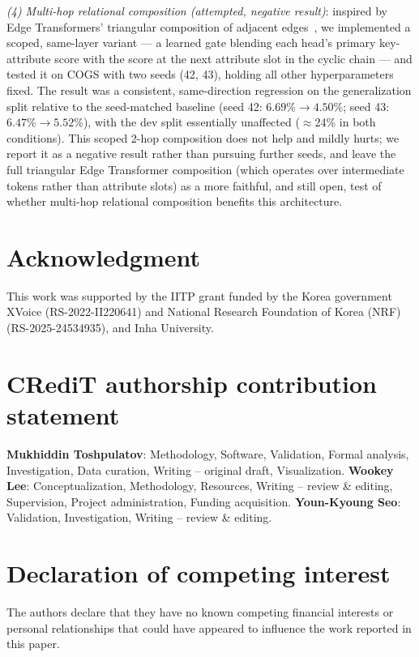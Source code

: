 \documentclass[review]{elsarticle}
\begin{document}
\emph{(4) Multi-hop relational composition (attempted, negative result)}: inspired by Edge Transformers' triangular composition of adjacent edges~\cite{bergen2021edge}, we implemented a scoped, same-layer variant --- a learned gate blending each head's primary key-attribute score with the score at the next attribute slot in the cyclic chain --- and tested it on COGS with two seeds (42, 43), holding all other hyperparameters fixed. The result was a consistent, same-direction regression on the generalization split relative to the seed-matched baseline (seed 42: $6.69\%\rightarrow4.50\%$; seed 43: $6.47\%\rightarrow5.52\%$), with the dev split essentially unaffected ($\approx$24\% in both conditions). This scoped 2-hop composition does not help and mildly hurts; we report it as a negative result rather than pursuing further seeds, and leave the full triangular Edge Transformer composition (which operates over intermediate tokens rather than attribute slots) as a more faithful, and still open, test of whether multi-hop relational composition benefits this architecture.

\section*{Acknowledgment}

This work was supported by the IITP grant funded by the Korea government XVoice (RS-2022-II220641) and National Research Foundation of Korea (NRF) (RS-2025-24534935), and Inha University.

\section*{CRediT authorship contribution statement}
\textbf{Mukhiddin Toshpulatov}: Methodology, Software, Validation, Formal analysis, Investigation, Data curation, Writing -- original draft, Visualization.
\textbf{Wookey Lee}: Conceptualization, Methodology, Resources, Writing -- review \& editing, Supervision, Project administration, Funding acquisition.
\textbf{Youn-Kyoung Seo}: Validation, Investigation, Writing -- review \& editing.

\section*{Declaration of competing interest}
The authors declare that they have no known competing financial interests or personal relationships that could have appeared to influence the work reported in this paper.
\end{document}
